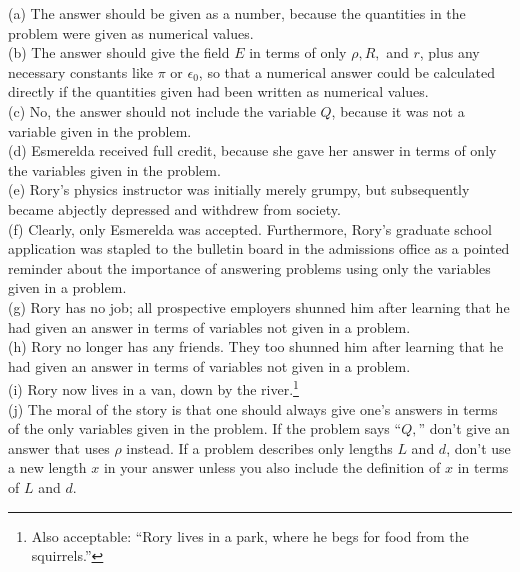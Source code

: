 \begin{Answer}
(a) The answer should be given as a number, because the quantities in the problem were given as numerical values.\\ 
(b) The answer should give the field $E$ in terms of only $\rho, R,$ and $r$, plus any necessary constants like $\pi$ or $\epsilon_0$, so that a numerical answer could be calculated directly if the quantities given had been written as numerical values.\\
(c) No, the answer should not include the variable $Q$, because it was not a variable given in the problem.\\
(d) Esmerelda received full credit, because she gave her answer in terms of only the variables given in the problem.\\
(e) Rory's physics instructor was initially merely grumpy, but subsequently became abjectly depressed and withdrew from society.\\
(f) Clearly, only Esmerelda was accepted.  Furthermore, Rory's graduate school application was stapled to the bulletin board in the admissions office as a pointed reminder about the importance of answering problems using only the variables given in a problem.\\ 
(g) Rory has no job; all prospective employers shunned him after learning that he had given an answer in terms of variables not given in a problem.\\  
(h) Rory no longer has any friends.  They too shunned him after learning that he had given an answer in terms of variables not given in a problem.\\
(i) Rory now lives in a van, down by the river.\footnote{Also acceptable: ``Rory lives in a park, where he begs for food from the squirrels.''}\\
(j) The moral of the story is that one should always give one's answers in terms of the only variables given in the problem.  If the problem says ``$Q,$'' don't give an answer that uses $\rho$ instead.  If a problem describes only lengths $L$ and $d$, don't use a new length $x$ in your answer unless you also include the definition of $x$ in terms of $L$ and $d$.
\end{Answer}

